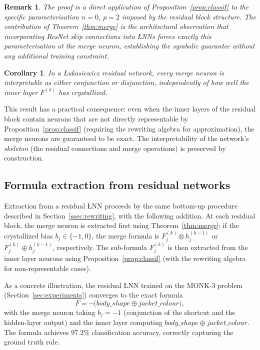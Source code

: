 \documentclass[10pt,a4paper,twoside]{article}
\newtheorem{corollary}[theorem]{Corollary}
\newtheorem{remark}[theorem]{Remark}
\newcommand{\tnorm}{\otimes}      %
\newcommand{\disj}{\oplus}        %
\newcommand{\LNN}{\L{}NN}
\begin{document}
\begin{remark}
The proof is a direct application of Proposition~\ref{prop:classif} to the
specific parameterisation $n=0$, $p=2$ imposed by the residual block
structure.
The contribution of Theorem~\ref{thm:merge} is the architectural observation
that incorporating ResNet skip connections into \LNN{}s forces exactly this
parameterisation at the merge neuron, establishing the symbolic guarantee
without any additional training constraint.
\end{remark}

\begin{corollary}
In a \L{}ukasiewicz residual network, every merge neuron is
interpretable as either conjunction or disjunction, independently of
how well the inner layer $F^{(k)}$ has crystallized.
\end{corollary}

This result has a practical consequence: even when the inner layers of the
residual block contain neurons that are not directly representable by
Proposition~\ref{prop:classif} (requiring the rewriting algebra for
approximation), the merge neurons are guaranteed to be exact.
The interpretability of the network's \emph{skeleton} (the residual connections
and merge operations) is preserved by construction.

\subsection{Formula extraction from residual networks}
\label{ssec:res_extract}

Extraction from a residual \LNN{} proceeds by the same bottom-up procedure
described in Section~\ref{ssec:rewriting}, with the following addition.
At each residual block, the merge neuron is extracted first using
Theorem~\ref{thm:merge}: if the crystallized bias $b_j \in \{-1,0\}$, the
merge formula is $F^{(k)}_j \tnorm h^{(k-1)}_j$ or
$F^{(k)}_j \disj h^{(k-1)}_j$, respectively.
The sub-formula $F^{(k)}_j$ is then extracted from the inner layer neurons
using Proposition~\ref{prop:classif} (with the rewriting algebra for
non-representable cases).

As a concrete illustration, the residual \LNN{} trained on the MONK-3 problem
(Section~\ref{sec:experiments}) converges to the exact formula
\begin{equation}
  F = \neg\!\bigl(\mathit{body\_shape} \disj \mathit{jacket\_colour}\bigr),
  \label{eq:monk3}
\end{equation}
with the merge neuron taking $b_j = -1$ (conjunction of the shortcut and
the hidden-layer output) and the inner layer computing
$\mathit{body\_shape} \disj \mathit{jacket\_colour}$.
The formula achieves $97.2\%$ classification accuracy, correctly capturing the
ground truth rule.
\end{document}
